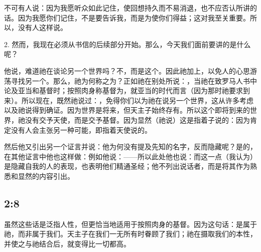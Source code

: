 不可有人说：因为我愿听众如此记住，使回想持久而不易消退，也不应否认所讲的话。因为我愿你们记住，不是要告诉我，而是为使你们得益；这对我至关重要。所以，没有人这样说。\par

2. 然而，我现在必须从书信的后续部分开始。那么，今天我们面前要讲的是什么呢？\par

他说，难道祂在谈论另一个世界吗？不，而是这个。因此祂加上，以免人的心思游荡寻找另一个。那么，祂为何称之为？正如祂在别处所说：，当祂在致罗马人书中论及亚当和基督时；按照肉身称基督为，就亚当的时代而言（因为那时祂要求到来）。所以现在，既然祂说过：，免得你们以为祂在说另一个世界，这从许多考虑以及祂说得到确证。因为世界是将来，但天主子始终存有。所以这个即将到来的世界，祂没有交予天使，而是交予基督。因为显然（祂说）这是指着子说的：因为肯定没有人会主张另一种可能，即指着天使说的。\par

然后他又引出另一个证言并说：他为何没有提及先知的名字，反而隐藏呢？是的，在其他证言中他也这样做：例如他说：——所以此处他也说：而这一点（我认为）是隐藏自我的人的表现，也表明他们精通圣经；他不列出说话者，而是将其作为熟悉和显然的内容引出。\par


\subsection{ 2:8}

  \par

虽然这些话是泛指人性，但更恰当地适用于按照肉身的基督。因为这句话：是属于祂，而非属于我们。天主子在我们一无所有时眷顾了我们；祂在摄取我们的本性，并使之与祂结合后，就变得比一切都高。\par

